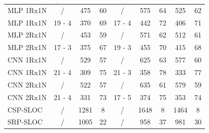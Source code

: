 \documentclass[review]{elsarticle}
\begin{document}
\begin{table}[!h]
{\begin{tabular}{l|ccc|ccc|cc}
		MLP 1Rx1N & /                          & 475                      & 60                            & /                          & 575                      & 64                            & 525                      & 62                            \\
		MLP 1Rx1N & 19 - 4                      & 370                      & 69                            & 17 - 4                      & 442                      & 72                            & 406                      & 71                            \\ \hline
		MLP 2Rx1N & /                          & 453                      & 59                            & /                          & 571                      & 62                            & 512                      & 61                            \\
		MLP 2Rx1N & 17 - 3                      & 375                      & 67                            & 19 - 3                      & 455                      & 70                            & 415                      & 68                            \\ \hline
		CNN 1Rx1N & /                          & 529                      & 57                            & /                          & 625                      & 63                            & 577                      & 60                            \\
		CNN 1Rx1N & 21 - 4                      & 309                      & 75                            & 21 - 3                      & 358                      & 78                            & 333                      & 77                            \\ \hline
		CNN 2Rx1N & /                          & 522                      & 57                            & /                          & 635                      & 61                            & 579                      & 59                            \\
		CNN 2Rx1N & 21 - 4                      & 331                      & 73                            & 17 - 5                      & 374                      & 75                            & 353                      & 74                            \\ \hline
		CSP-SLOC  & /                          & 1281                     & 8                             & /                          & 1648                     & 8                             & 1464                     & 8                             \\ \hline
		SRP-SLOC  & /                          & 1005                     & 22                            & /                          & 958                      & 37                            & 981                      & 30 \\ 
	\end{tabular}
	}
\end{table}
\end{document}
